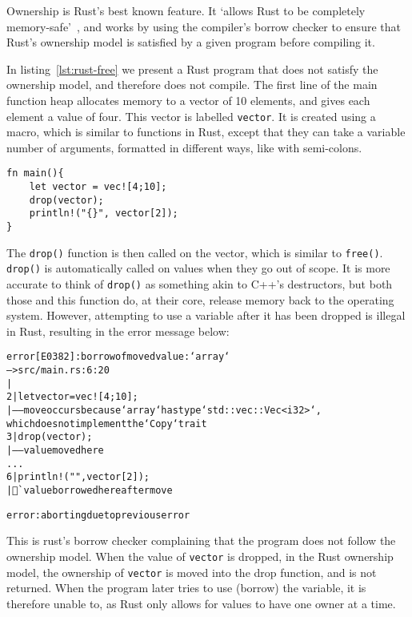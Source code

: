 Ownership is Rust's best known feature. It `allows Rust to be completely memory-safe'~\cite{NomOwner}, and works by using the compiler's borrow checker to ensure that Rust's ownership model is satisfied by a given program before compiling it.

In listing~\ref{lst:rust-free} we present a Rust program that does not satisfy the ownership model, and therefore does not compile. The first line of the main function heap allocates memory to a vector of 10 elements, and gives each element a value of four. This vector is labelled \texttt{vector}. It is created using a macro, which is similar to functions in Rust, except that they can take a variable number of arguments, formatted in different ways, like with semi-colons.

\begin{code}
\begin{verbatim}
fn main(){
    let vector = vec![4;10];
    drop(vector);
    println!("{}", vector[2]);
}
\end{verbatim}
\label{lst:rust-free}
\end{code}

The \texttt{drop()} function is then called on the vector, which is similar to \texttt{free()}. \texttt{drop()} is automatically called on values when they go out of scope. It is more accurate to think of \texttt{drop()} as something akin to C++'s destructors, but both those and this function do, at their core, release memory back to the operating system. However, attempting to use a variable after it has been dropped is illegal in Rust, resulting in the error message below:

\begin{alltt}
\scriptsize
error[E0382]: borrow of moved value: `array`
 --> src/main.rs:6:20
  |
2 |     let vector = vec![4;10];
  |         ----- move occurs because `array` has type `std::vec::Vec<i32>`,
  which does not implement the `Copy` trait
3 |     drop(vector);
  |          ----- value moved here
...
6 |     println!("{}", vector[2]);
  |                    ^^^^^ value borrowed here after move

error: aborting due to previous error
\end{alltt}

This is rust's borrow checker complaining that the program does not follow the ownership model. When the value of \texttt{vector} is dropped, in the Rust ownership model, the ownership of \texttt{vector} is moved into the drop function, and is not returned. When the program later tries to use (borrow) the variable, it is therefore unable to, as Rust only allows for values to have one owner at a time.

